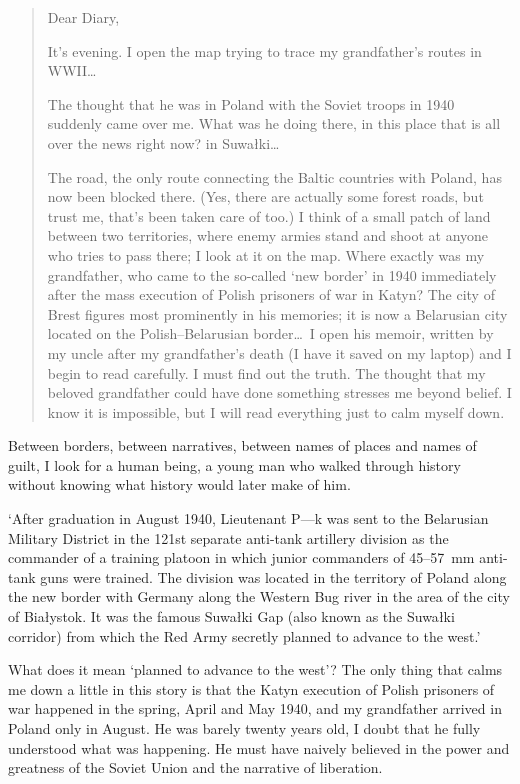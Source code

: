 \begin{quotation}
  
Dear Diary,

\medskip

It's evening. I open the map trying to trace my grandfather's routes in WWII\ldots 

The thought that he was in Poland with the Soviet troops in 1940
suddenly came over me. What was he doing there, in this place that is
all over the news right now? in Suwa{\l}ki\ldots

The road, the only route connecting the Baltic countries with Poland,
has now been blocked there. (Yes, there are actually some forest
roads, but trust me, that's been taken care of too.) I think of a small
patch of land between two territories, where enemy armies stand and
shoot at anyone who tries to pass there; I look at it on the
map. Where exactly was my grandfather, who came to the so-called `new
border' in 1940 immediately after the mass execution of Polish
prisoners of war in Katyn? The city of Brest figures most prominently
in his memories; it is now a Belarusian city located on the
Polish--Belarusian border\ldots\ I open his memoir, written by my uncle
after my grandfather's death (I have it saved on my laptop) and I
begin to read carefully. I must find out the truth. The thought that
my beloved grandfather could have done something stresses me
beyond belief. I know it is impossible, but I will read everything
just to calm myself down.

\end{quotation}

Between borders, between narratives, between names of places and names of guilt,
I look for a human being, a young man who walked through history without knowing
what history would later make of him.

`After graduation in August 1940, Lieutenant P---k was sent to the
Belarusian Military District in the 121st separate anti-tank artillery
division as the commander of a training platoon in which junior
commanders of 45--57~mm anti-tank guns were trained. The division was
located in the territory of Poland along the new border with Germany
along the Western Bug river in the area of the city of Bia{\l}ystok. It
was the famous Suwa{\l}ki Gap (also known as the Suwa{\l}ki corridor) from
which the Red Army secretly planned to advance to the west.'

What does it mean `planned to advance to the west'? The only thing
that calms me down a little in this story is that the Katyn execution
of Polish prisoners of war happened in the spring, April and May 1940,
and my grandfather arrived in Poland only in August. He was barely
twenty years old, I doubt that he fully understood what was
happening. He must have naively believed in the power and greatness of
the Soviet Union and the narrative of liberation.

